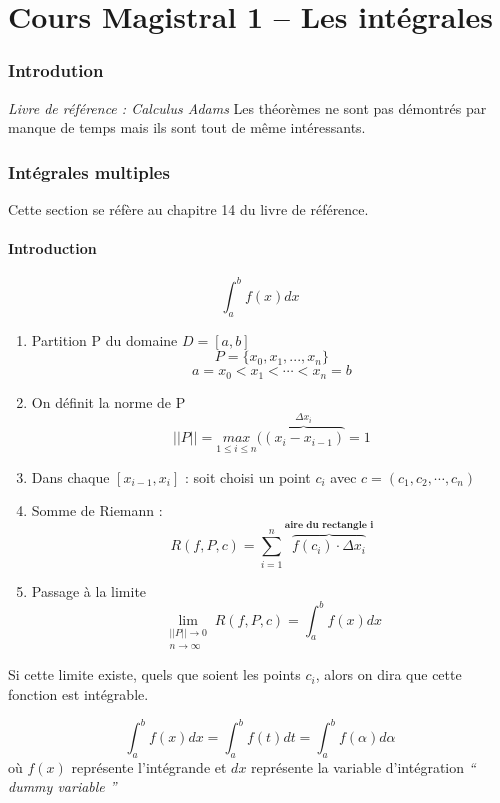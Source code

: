 \part{Cours Magistral 1 -- Les intégrales}
\section{Introdution}
\emph{Livre de référence : Calculus Adams}
Les théorèmes ne sont pas démontrés par manque de temps mais ils sont tout de même intéressants.
\section{Intégrales multiples}

Cette section se réfère au chapitre 14 du livre de référence.
\subsection{Introduction}
\[\int_{a}^{b} {f(x) dx}\]


\begin{enumerate}

\item Partition P du domaine $D=[a,b]$
$$ P = \{x_0,x_1,...,x_n\}$$
$$a=x_0<x_1<\cdots<x_n=b$$
\item On définit la norme de P
$$||P|| = \underset{1\le i \le n}{max}(\overbrace{(x_i-x_{i-1})}^{\Delta x_i}=1$$

\item Dans chaque $[{x_{i-1},x_i}]$ : soit choisi un point $c_i$ avec $c=(c_1,c_2,\cdots,c_n)$

\item  Somme de Riemann : $$R(f,P,c)=\sum_{i=1}^{n} \overbrace{f(c_i)\cdot \Delta  x_i}^{\textbf{aire du rectangle i}} $$

\item Passage à la limite $$\lim\limits_{\substack{||P|| \to 0 \\ n \to \infty}} R(f,P,c) =\int_{a}^{b} {f(x) dx}$$

\end{enumerate}
Si cette limite existe, quels que soient les points $c_i$, alors on dira que cette fonction est intégrable.
\begin{myrem}
$$\int_{a}^{b} {f(x) dx} = \int_{a}^{b} {f(t) dt} = \int_{a}^{b} {f(\alpha) d\alpha}$$ où $f(x)$ représente l'intégrande et $dx$ représente la variable d'intégration \textit{`` dummy variable ''}
\end{myrem}

